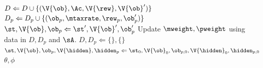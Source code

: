 \begin{algorithm}[t]
\begin{algorithmic}
        \EndIf
        \State $D \Leftarrow D \cup \{(\V{\ob}, \Ac, \V{\rew}, \V{\ob}')\}$ 
        \State $D_p \Leftarrow D_p \cup \{(\ob_p, \mtaxrate, \rew_p, \ob'_p)\}$ 
        \State $\st, \V{\ob}, \ob_p \Leftarrow \st', \V{\ob}', \ob'_p$
    \EndFor
    \State Update $\mweight, \pweight$ using data in $D, D_p$ and $\sA$.
    \State $D, D_p \Leftarrow \{\}, \{\}$ 
        \State $\st, \V{\ob}, \ob_p, \V{\hidden}, \hidden_p \Leftarrow \st_0, \V{\ob}_0, \ob_{p, 0}, \V{\hidden}_0, \hidden_{p, 0}$ 
    \EndIf
        \Return $\theta, \phi$
    \EndIf
    \EndWhile
\end{algorithmic}
\end{algorithm}